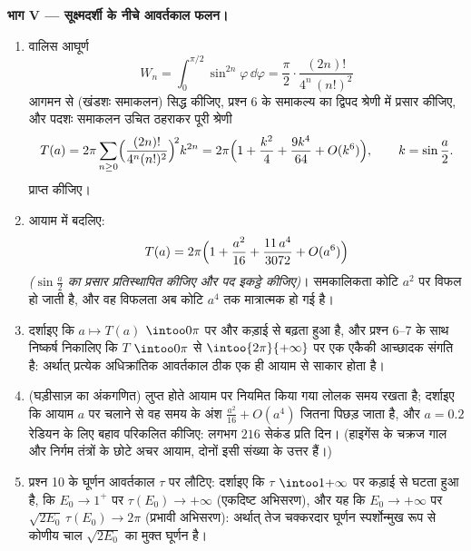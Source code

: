 \begin{problem}
\medskip
\noindent\textbf{भाग V --- सूक्ष्मदर्शी के नीचे आवर्तकाल फलन।}
\begin{enumerate}[resume]
  \item वालिस आघूर्ण
        \[
        W_n = \int_0^{\pi/2}\sin^{2n}\varphi\,\dd\varphi
        = \frac\pi2\cdot\frac{(2n)!}{4^n\,(n!)^2}
        \]
        आगमन से (खंडशः समाकलन) सिद्ध कीजिए, प्रश्न 6 के समाकल्य
        का द्विपद श्रेणी में प्रसार कीजिए, और पदशः समाकलन उचित
        ठहराकर पूरी श्रेणी
        \[
        T(a) = 2\pi\sum_{n\geq0}
        \Bigl(\frac{(2n)!}{4^n(n!)^2}\Bigr)^{\!2}k^{2n}
        = 2\pi\Bigl(1 + \frac{k^2}4 + \frac{9k^4}{64}
        + O(k^6)\Bigr),
        \qquad k = \sin\frac a2 .
        \]
        प्राप्त कीजिए।
  \item आयाम में बदलिए:
        \[
        T(a) = 2\pi\Bigl(1 + \frac{a^2}{16} +
        \frac{11\,a^4}{3072} + O(a^6)\Bigr)
        \]
        \emph{($\sin\frac a2$ का प्रसार प्रतिस्थापित कीजिए और पद इकट्ठे
        कीजिए)}। समकालिकता कोटि $a^2$ पर विफल हो जाती है, और वह
        विफलता अब कोटि $a^4$ तक मात्रात्मक हो गई है।
  \item दर्शाइए कि $a \mapsto T(a)$ $\intoo0\pi$ पर  और कड़ाई से बढ़ता हुआ है,
        और प्रश्न 6--7 के साथ निष्कर्ष निकालिए कि $T$ $\intoo0\pi$ से
        $\intoo{2\pi}{+\infty}$ पर एक एकैकी आच्छादक संगति है: अर्थात् प्रत्येक
        अधिक्रांतिक आवर्तकाल ठीक एक ही आयाम से साकार होता है।
  \item (घड़ीसाज़ का अंकगणित) लुप्त होते आयाम पर नियमित किया गया
        लोलक  समय रखता है; दर्शाइए कि आयाम $a$ पर चलाने से
        वह  समय के अंश $\frac{a^2}{16} + O(a^4)$ जितना पिछड़ जाता है, और $a = 0.2$
        रेडियन के लिए बहाव परिकलित कीजिए: लगभग $216$ सेकंड प्रति
        दिन। (हाइगेंस के चक्रज गाल और निर्गम तंत्रों के छोटे
        अचर आयाम, दोनों इसी संख्या के उत्तर हैं।)
  \item प्रश्न 10 के घूर्णन आवर्तकाल $\tau$ पर लौटिए: दर्शाइए कि
        $\tau$ $\intoo1{+\infty}$ पर कड़ाई से घटता हुआ है, कि $E_0 \to 1^+$ पर $\tau(E_0) \to +\infty$
        (एकदिष्ट अभिसरण), और यह कि $E_0 \to
        +\infty$ पर $\sqrt{2E_0}\,\tau(E_0) \to 2\pi$ (प्रभावी
        अभिसरण): अर्थात् तेज चक्करदार घूर्णन स्पर्शोन्मुख रूप से
        कोणीय चाल $\sqrt{2E_0}$ का मुक्त घूर्णन है।
\end{enumerate}


\end{problem}
